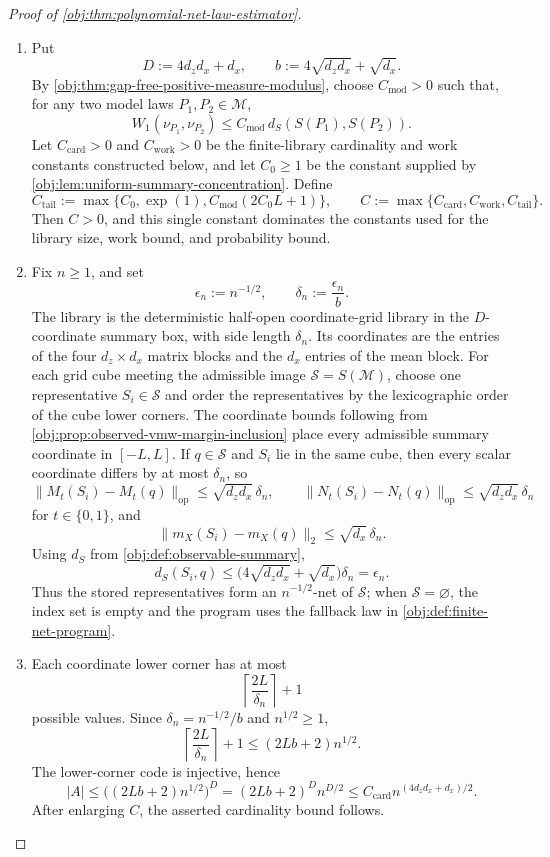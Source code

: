 \documentclass[11pt]{article}
\begin{document}
\begin{proof}[Proof of \cref{obj:thm:polynomial-net-law-estimator}]
\begin{enumerate}
\item Put
\[
D:=4d_zd_x+d_x,\qquad
b:=4\sqrt{d_zd_x}+\sqrt{d_x}.
\]
By \cref{obj:thm:gap-free-positive-measure-modulus}, choose
\(C_{\mathrm{mod}}>0\) such that, for any two model laws \(P_1,P_2\in\mathcal M\),
\[
W_1(\nu_{P_1},\nu_{P_2})
\le C_{\mathrm{mod}}\,d_S(S(P_1),S(P_2)).
\]
Let \(C_{\mathrm{card}}>0\) and \(C_{\mathrm{work}}>0\) be the finite-library
cardinality and work constants constructed below, and let \(C_0\ge1\) be the
constant supplied by \cref{obj:lem:uniform-summary-concentration}.  Define
\[
C_{\mathrm{tail}}
:=
\max\{C_0,\exp(1),C_{\mathrm{mod}}(2C_0L+1)\},
\qquad
C:=\max\{C_{\mathrm{card}},C_{\mathrm{work}},C_{\mathrm{tail}}\}.
\]
Then \(C>0\), and this single constant dominates the constants used for the
library size, work bound, and probability bound. %

\item Fix \(n\ge1\), and set
\[
\epsilon_n:=n^{-1/2},\qquad
\delta_n:=\frac{\epsilon_n}{b}.
\]
The library is the deterministic half-open coordinate-grid library in the
\(D\)-coordinate summary box, with side length \(\delta_n\).  Its coordinates
are the entries of the four \(d_z\times d_x\) matrix blocks and the \(d_x\)
entries of the mean block.  For each grid cube meeting the admissible image
\(\mathscr S=S(\mathcal M)\), choose one representative \(S_i\in\mathscr S\)
and order the representatives by the lexicographic order of the cube lower
corners.  The coordinate bounds following from
\cref{obj:prop:observed-vmw-margin-inclusion} place every admissible summary
coordinate in \([-L,L]\).  If \(q\in\mathscr S\) and \(S_i\) lie in the same
cube, then every scalar coordinate differs by at most \(\delta_n\), so
\[
\|M_t(S_i)-M_t(q)\|_{\mathrm{op}}
\le \sqrt{d_zd_x}\,\delta_n,\qquad
\|N_t(S_i)-N_t(q)\|_{\mathrm{op}}
\le \sqrt{d_zd_x}\,\delta_n
\]
for \(t\in\{0,1\}\), and
\[
\|m_X(S_i)-m_X(q)\|_2\le \sqrt{d_x}\,\delta_n .
\]
Using \(d_S\) from \cref{obj:def:observable-summary},
\[
d_S(S_i,q)
\le
\bigl(4\sqrt{d_zd_x}+\sqrt{d_x}\bigr)\delta_n
=\epsilon_n .
\]
Thus the stored representatives form an \(n^{-1/2}\)-net of \(\mathscr S\);
when \(\mathscr S=\varnothing\), the index set is empty and the program uses
the fallback law in \cref{obj:def:finite-net-program}. %

\item Each coordinate lower corner has at most
\[
\left\lceil \frac{2L}{\delta_n}\right\rceil+1
\]
possible values.  Since \(\delta_n=n^{-1/2}/b\) and \(n^{1/2}\ge1\),
\[
\left\lceil \frac{2L}{\delta_n}\right\rceil+1
\le (2Lb+2)n^{1/2}.
\]
The lower-corner code is injective, hence
\[
|A|
\le \bigl((2Lb+2)n^{1/2}\bigr)^D
=(2Lb+2)^D n^{D/2}
\le C_{\mathrm{card}} n^{(4d_zd_x+d_x)/2}.
\]
After enlarging \(C\), the asserted cardinality bound follows. %


\end{enumerate}
\end{proof}
\end{document}

